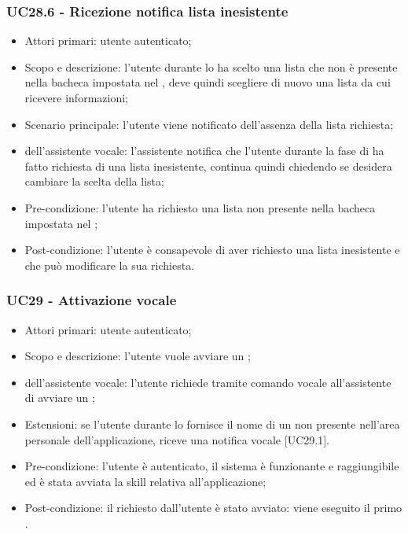 \subsubsection{UC28.6 - Ricezione notifica lista inesistente}
\begin{itemize}
	\item  Attori primari: utente autenticato;
	\item  Scopo e descrizione: l'utente durante lo  ha scelto una lista che non è presente nella bacheca impostata nel , deve quindi scegliere di nuovo una lista da cui ricevere informazioni;
	\item  Scenario principale: l'utente viene notificato dell'assenza della lista richiesta;
	\item  {} dell'assistente vocale: l'assistente notifica che l'utente durante la fase di  ha fatto richiesta di una lista inesistente, continua quindi chiedendo se desidera cambiare la scelta della lista;
	\item  Pre-condizione: l'utente ha richiesto una lista non presente nella bacheca impostata nel ;
	\item  Post-condizione: l'utente è consapevole di aver richiesto una lista inesistente e che può modificare la sua richiesta.
\end{itemize}
\subsubsection{UC29 - Attivazione vocale }
\begin{itemize}
	\item Attori primari: utente autenticato;
	\item Scopo e descrizione: l'utente vuole avviare un ;
	\item {} dell'assistente vocale: l'utente richiede tramite comando vocale all'assistente   di avviare un ;
	\item Estensioni:
		se l'utente durante lo  fornisce il nome di un  non presente nell'area personale dell'applicazione, riceve una notifica vocale [UC29.1].
	\item Pre-condizione: l'utente è autenticato, il sistema è funzionante e raggiungibile ed è stata avviata la skill relativa all'applicazione;
	\item Post-condizione: il  richiesto dall'utente è stato avviato: viene eseguito il primo .
\end{itemize}
